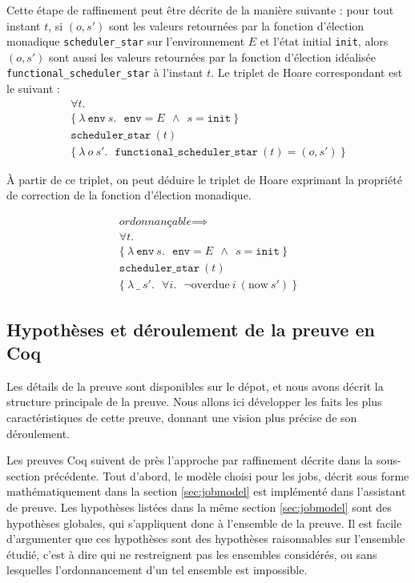 	Cette étape de raffinement peut être décrite de la manière suivante : pour tout instant $t$, si $(o, s')$ sont les valeurs retournées par la fonction d'élection monadique \texttt{scheduler\_star} sur l'environnement $E$ et l'état initial \texttt{init}, alors $(o, s')$ sont aussi les valeurs retournées par la fonction d'élection idéalisée \texttt{functional\_scheduler\_star} à l'instant $t$. Le triplet de Hoare correspondant est le suivant :
	\begin{gather*}
		\forall t.\\
		\{
		~\lambda~\mathtt{env}~s.~~~\mathtt{env} = E~~\land~~s = \mathtt{init}~
		\}\\
		\texttt{scheduler\_star}~(t)\\
		\{
		~\lambda~o~s'.~~~\texttt{functional\_scheduler\_star}~(t) = (o,s')~
		\}
	\end{gather*}

	À partir de ce triplet, on peut déduire le triplet de Hoare exprimant la propriété de correction de la fonction d'élection monadique.

	\begin{gather*}
		\textit{ordonnançable} \implies\\
		\forall t.\\
		\{
		~\lambda~\mathtt{env}~s.~~~\mathtt{env} = E~~\land~~s = \mathtt{init}~
		\}\\
		\texttt{scheduler\_star}~(t)\\
		\{
		~\lambda~\_~s'.~~~\forall i.~~~\neg \text{overdue}~i~(\text{now}~s') ~
		\}
	\end{gather*}


	\subsection{Hypothèses et déroulement de la preuve en Coq}

	Les détails de la preuve sont disponibles sur le dépot, et nous avons décrit la structure principale de la preuve. Nous allons ici développer les faits les plus caractéristiques de cette preuve, donnant une vision plus précise de son déroulement. 

	Les preuves Coq suivent de près l'approche par raffinement décrite dans la sous-section précédente. Tout d'abord, le modèle choisi pour les jobs, décrit sous forme mathématiquement dans la section \ref{sec:jobmodel} est implémenté dans l'assistant de preuve. Les hypothèses listées dans la même section \ref{sec:jobmodel} sont des hypothèses globales, qui s'appliquent donc à l'ensemble de la preuve. Il est facile d'argumenter que ces hypothèses sont des hypothèses raisonnables sur l'ensemble étudié, c'est à dire qui ne restreignent pas les ensembles considérés, ou sans lesquelles l'ordonnancement d'un tel ensemble est impossible.

